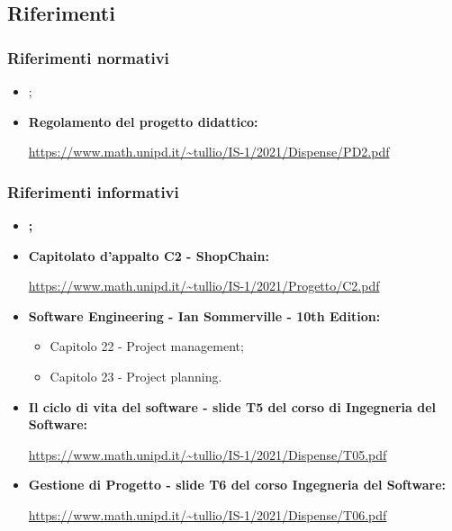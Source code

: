 \subsection{Riferimenti} \label{subsection:intro_riferimenti}
\subsubsection{Riferimenti normativi} \label{subsubsection:intro_riferimenti_normativi}
\begin{itemize}
  \item \textbf{\docNameVersionNdP{}};
  \item \textbf{Regolamento del progetto didattico:}
  \begin{center}
    \url{https://www.math.unipd.it/~tullio/IS-1/2021/Dispense/PD2.pdf}
  \end{center}
\end{itemize}
\subsubsection{Riferimenti informativi} \label{subsubsection:intro_riferimenti_informativi}
\begin{itemize}
  \item \textbf{\docNameVersionAdR{};}
  \item \textbf{Capitolato d'appalto C2 - ShopChain:}
  \begin{center}
    \url{https://www.math.unipd.it/~tullio/IS-1/2021/Progetto/C2.pdf}
  \end{center}
  \item \textbf{Software Engineering - Ian Sommerville - 10th Edition:}
  \begin{itemize}
    \item Capitolo 22 - Project management;
    \item Capitolo 23 - Project planning.
  \end{itemize}
  \item \textbf{Il ciclo di vita del software - slide T5 del corso di Ingegneria del Software:}
  \begin{center}
    \url{https://www.math.unipd.it/~tullio/IS-1/2021/Dispense/T05.pdf}
  \end{center}
  \item \textbf{Gestione di Progetto - slide T6 del corso Ingegneria del Software:}
  \begin{center}
    \url{https://www.math.unipd.it/~tullio/IS-1/2021/Dispense/T06.pdf}
  \end{center}
\end{itemize}

